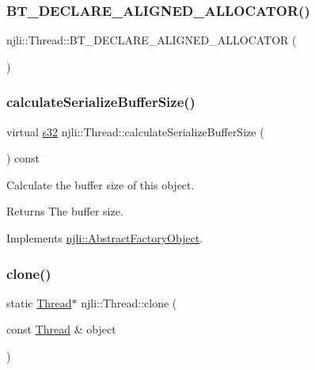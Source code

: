 \subsubsection{\texorpdfstring{B\+T\+\_\+\+D\+E\+C\+L\+A\+R\+E\+\_\+\+A\+L\+I\+G\+N\+E\+D\+\_\+\+A\+L\+L\+O\+C\+A\+T\+O\+R()}{BT\_DECLARE\_ALIGNED\_ALLOCATOR()}}
{\footnotesize\ttfamily njli\+::\+Thread\+::\+B\+T\+\_\+\+D\+E\+C\+L\+A\+R\+E\+\_\+\+A\+L\+I\+G\+N\+E\+D\+\_\+\+A\+L\+L\+O\+C\+A\+T\+OR (\begin{DoxyParamCaption}{ }\end{DoxyParamCaption})\hspace{0.3cm}{\ttfamily [protected]}}

\mbox{\label{classnjli_1_1_thread_aa3b2e7df4ade1f690d8325d788c67bef}} 
\subsubsection{\texorpdfstring{calculate\+Serialize\+Buffer\+Size()}{calculateSerializeBufferSize()}}
{\footnotesize\ttfamily virtual \mbox{\hyperlink{_util_8h_aa62c75d314a0d1f37f79c4b73b2292e2}{s32}} njli\+::\+Thread\+::calculate\+Serialize\+Buffer\+Size (\begin{DoxyParamCaption}{ }\end{DoxyParamCaption}) const\hspace{0.3cm}{\ttfamily [virtual]}}

Calculate the buffer size of this object.

\begin{DoxyReturn}{Returns}
The buffer size. 
\end{DoxyReturn}


Implements \mbox{\hyperlink{classnjli_1_1_abstract_factory_object_a4763d05bc9dc37c559111f8bb30e1dd8}{njli\+::\+Abstract\+Factory\+Object}}.

\mbox{\label{classnjli_1_1_thread_a704923b90ea123659acaa4545b76c8b3}} 
\subsubsection{\texorpdfstring{clone()}{clone()}}
{\footnotesize\ttfamily static \mbox{\hyperlink{classnjli_1_1_thread}{Thread}}$\ast$ njli\+::\+Thread\+::clone (\begin{DoxyParamCaption}\item[{const \mbox{\hyperlink{classnjli_1_1_thread}{Thread}} \&}]{object }\end{DoxyParamCaption})\hspace{0.3cm}{\ttfamily [static]}}

